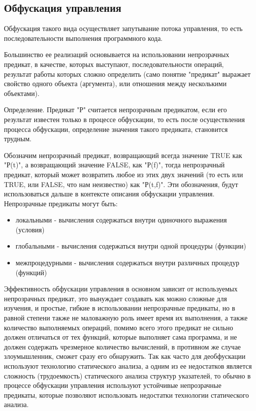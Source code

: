 \subsection{Обфускация управления}

Обфускация такого вида осуществляет запутывание потока управления, то есть последовательности выполнения программного кода.

Большинство ее реализаций основывается на использовании непрозрачных предикат, в качестве, которых выступают, последовательности операций, результат работы которых сложно определить (само понятие "предикат" выражает свойство одного объекта (аргумента), или отношения между несколькими объектами).

Определение. Предикат "Р" считается непрозрачным предикатом, если его результат известен только в процессе обфускации, то есть после осуществления процесса обфускации, определение значения такого предиката, становится трудным.

Обозначим непрозрачный предикат, возвращающий всегда значение TRUE как "Р(t)", а возвращающий значение FALSE, как "Р(f)", тогда непрозрачный предикат, который может возвратить любое из этих двух значений (то есть или TRUE, или FALSE, что нам неизвестно) как "Р(t,f)". Эти обозначения, будут использоваться дальше в контексте описания обфускации управления. Непрозрачные предикаты могут быть:

\begin{itemize}
\item локальными - вычисления содержаться внутри одиночного выражения (условия)
\item глобальными - вычисления содержаться внутри одной процедуры (функции)
\item межпроцедурными - вычисления содержаться внутри различных процедур (функций)
\end{itemize}

Эффективность обфускации управления в основном зависит от используемых непрозрачных предикат, это вынуждает создавать как можно сложные для изучения, и простые, гибкие в использовании непрозрачные предикаты, но в равной степени также не маловажную роль имеет время их выполнения, а также количество выполняемых операций, помимо всего этого предикат не сильно должен отличаться от тех функций, которые выполняет сама программа, и не должен содержать чрезмерное количество вычислений, в противном же случае злоумышленник, сможет сразу его обнаружить. Так как часто для деобфускации используют технологию статического анализа, а одним из ее недостатков является сложность (трудоемкость) статического анализа структур указателей, то обычно в процессе обфускации управления используют устойчивые непрозрачные предикаты, которые позволяют использовать недостатки технологии статического анализа.


